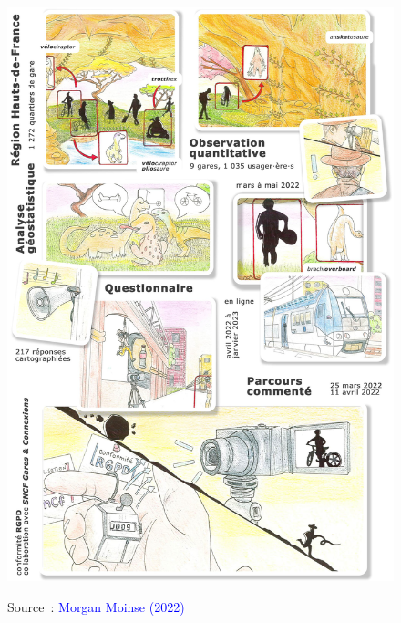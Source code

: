 \begin{refsegment}
\begin{figure}[h!]\vspace*{4pt}
        \caption*{}
        \label{graphical-abstract-chap3}
        \centerline{\includegraphics[width=1\columnwidth]{src/Figures/Graphical-abstract/FR_Graphical_abstract_chap3.jpg}}
        \vspace{5pt}
        \begin{flushright}\scriptsize{
        Source~: \textcolor{blue}{Morgan Moinse (2022)}
        }\end{flushright}
    \end{figure}


\end{refsegment}
